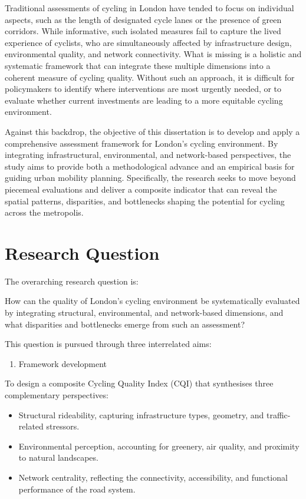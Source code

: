 \documentclass[
  12pt,
  oneside]{book}
\providecommand{\tightlist}{%
  \setlength{\itemsep}{0pt}\setlength{\parskip}{0pt}}
\begin{document}
Traditional assessments of cycling in London have tended to focus on individual aspects, such as the length of designated cycle lanes or the presence of green corridors. While informative, such isolated measures fail to capture the lived experience of cyclists, who are simultaneously affected by infrastructure design, environmental quality, and network connectivity. What is missing is a holistic and systematic framework that can integrate these multiple dimensions into a coherent measure of cycling quality. Without such an approach, it is difficult for policymakers to identify where interventions are most urgently needed, or to evaluate whether current investments are leading to a more equitable cycling environment.

Against this backdrop, the objective of this dissertation is to develop and apply a comprehensive assessment framework for London's cycling environment. By integrating infrastructural, environmental, and network-based perspectives, the study aims to provide both a methodological advance and an empirical basis for guiding urban mobility planning. Specifically, the research seeks to move beyond piecemeal evaluations and deliver a composite indicator that can reveal the spatial patterns, disparities, and bottlenecks shaping the potential for cycling across the metropolis.

\section{Research Question}\label{research-question}

The overarching research question is:

How can the quality of London's cycling environment be systematically evaluated by integrating structural, environmental, and network-based dimensions, and what disparities and bottlenecks emerge from such an assessment?

This question is pursued through three interrelated aims:

\begin{enumerate}
\def\labelenumi{\arabic{enumi}.}
\tightlist
\item
  Framework development
\end{enumerate}

To design a composite Cycling Quality Index (CQI) that synthesises three complementary perspectives:

\begin{itemize}
\tightlist
\item
  Structural rideability, capturing infrastructure types, geometry, and traffic-related stressors.\\
\item
  Environmental perception, accounting for greenery, air quality, and proximity to natural landscapes.\\
\item
  Network centrality, reflecting the connectivity, accessibility, and functional performance of the road system.
\end{itemize}
\end{document}
